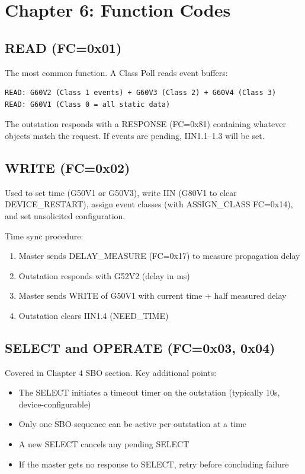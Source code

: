 \documentclass[11pt,twoside]{article}
\begin{document}
\section{Chapter 6: Function Codes}

\subsection{READ (FC=0x01)}

The most common function. A Class Poll reads event buffers:
\begin{verbatim}
READ: G60V2 (Class 1 events) + G60V3 (Class 2) + G60V4 (Class 3)
READ: G60V1 (Class 0 = all static data)
\end{verbatim}
The outstation responds with a RESPONSE (FC=0x81) containing whatever objects match the request. If events are pending, IIN1.1--1.3 will be set.

\subsection{WRITE (FC=0x02)}

Used to set time (G50V1 or G50V3), write IIN (G80V1 to clear DEVICE\_RESTART), assign event classes (with ASSIGN\_CLASS FC=0x14), and set unsolicited configuration.

Time sync procedure:
\begin{enumerate}[noitemsep]
  \item Master sends DELAY\_MEASURE (FC=0x17) to measure propagation delay
  \item Outstation responds with G52V2 (delay in ms)
  \item Master sends WRITE of G50V1 with current time + half measured delay
  \item Outstation clears IIN1.4 (NEED\_TIME)
\end{enumerate}

\subsection{SELECT and OPERATE (FC=0x03, 0x04)}

Covered in Chapter 4 SBO section. Key additional points:
\begin{itemize}[noitemsep]
  \item The SELECT initiates a timeout timer on the outstation (typically 10s, device-configurable)
  \item Only one SBO sequence can be active per outstation at a time
  \item A new SELECT cancels any pending SELECT
  \item If the master gets no response to SELECT, retry before concluding failure
\end{itemize}
\end{document}
